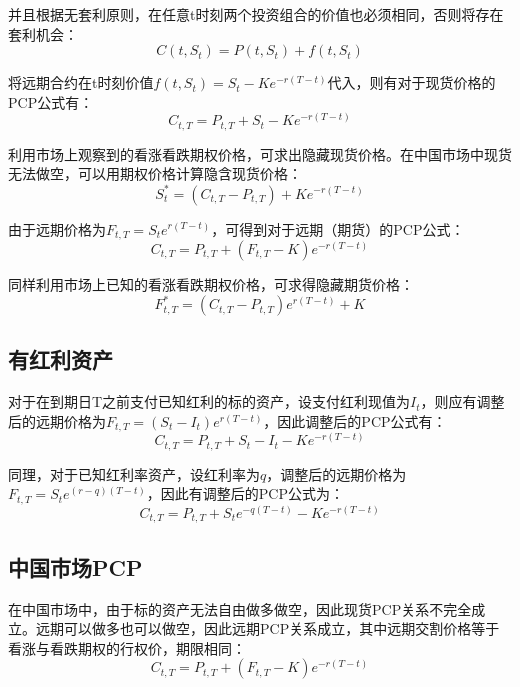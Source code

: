 \documentclass[11pt]{article}
\begin{document}
并且根据无套利原则，在任意t时刻两个投资组合的价值也必须相同，否则将存在套利机会：
\begin{equation*}
    C(t,S_t) = P(t,S_t) + f(t,S_t)
\end{equation*}

将远期合约在t时刻价值$f(t,S_t) = S_t - Ke^{-r(T-t)}$代入，则有对于现货价格的PCP公式有：
\begin{equation*}
    C_{t,T} = P_{t,T} +  S_t - K e^{-r(T-t)}
\end{equation*}

利用市场上观察到的看涨看跌期权价格，可求出隐藏现货价格。在中国市场中现货无法做空，可以用期权价格计算隐含现货价格：
\begin{equation*}
    S^*_t = \left( C_{t,T} - P_{t,T} \right) + K e^{-r(T-t)}
\end{equation*}

由于远期价格为$F_{t,T} = S_t e^{r(T-t)}$，可得到对于远期（期货）的PCP公式：
\begin{equation*}
    C_{t,T} = P_{t,T} + \left( F_{t,T} - K \right) e^{-r(T-t)}
\end{equation*}

同样利用市场上已知的看涨看跌期权价格，可求得隐藏期货价格：
\begin{equation*}
    F^*_{t,T} = \left( C_{t,T} - P_{t,T} \right) e^{r(T-t)} + K
\end{equation*}

\subsection{有红利资产}

对于在到期日T之前支付已知红利的标的资产，设支付红利现值为$I_t$，则应有调整后的远期价格为$F_{t,T} = (S_t - I_t)e^{r(T-t)}$，因此调整后的PCP公式有：
\begin{equation*}
    C_{t,T} = P_{t,T} + S_t - I_t - Ke^{-r(T-t)}
\end{equation*}

同理，对于已知红利率资产，设红利率为$q$，调整后的远期价格为$F_{t,T} = S_t e^{(r-q)(T-t)}$，因此有调整后的PCP公式为：
\begin{equation*}
    C_{t,T} = P_{t,T} + S_t e^{-q(T-t)} - Ke^{-r(T-t)}
\end{equation*}

\subsection{中国市场PCP}

在中国市场中，由于标的资产无法自由做多做空，因此现货PCP关系不完全成立。远期可以做多也可以做空，因此远期PCP关系成立，其中远期交割价格等于看涨与看跌期权的行权价，期限相同：
\begin{equation*}
    C_{t,T} = P_{t,T} + \left( F_{t,T} - K \right) e^{-r(T-t)}
\end{equation*}
\end{document}
